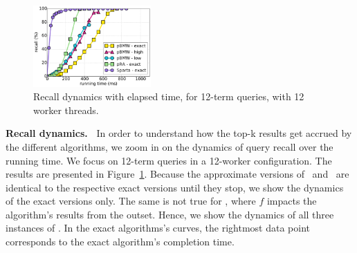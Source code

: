 {\begin{figure}[hbt]
\centering
{}
         \includegraphics[width=0.4\textwidth]{figures/cumulative_12threads_clueweb.pdf}
       \caption{Recall dynamics with elapsed time, for 12-term queries, with 12 worker threads.}
       \label{fig:dynamics}
\end{figure}

{\bf Recall dynamics.\ } 
In order to understand how the top-k results get accrued by the different algorithms, we zoom in on the dynamics of query 
recall over the running time. We focus on 12-term queries in a 12-worker configuration. The results are presented in 
Figure~\ref{fig:dynamics}.
Because the approximate versions of \alg\ and \pRA\ are  identical to the respective exact versions until they stop, 
we show the dynamics of the exact versions only.  The same is not true for \pBMW, where $f$ impacts the algorithm's results from the outset.
Hence, we show the dynamics of all three instances of \pBMW. 
In the exact algorithms's curves, the rightmost data point corresponds to the exact algorithm's completion time.   

}
